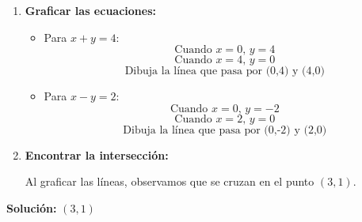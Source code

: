     \begin{enumerate}
        \item \textbf{Graficar las ecuaciones:}
            \begin{itemize}
                \item Para \(x + y = 4\):
                    \[
                    \text{Cuando } x = 0, \, y = 4
                    \]
                    \[
                    \text{Cuando } x = 4, \, y = 0
                    \]
                    \[
                    \text{Dibuja la línea que pasa por (0,4) y (4,0)}
                    \]
    
                \item Para \(x - y = 2\):
                    \[
                    \text{Cuando } x = 0, \, y = -2
                    \]
                    \[
                    \text{Cuando } x = 2, \, y = 0
                    \]
                    \[
                    \text{Dibuja la línea que pasa por (0,-2) y (2,0)}
                    \]
            \end{itemize}
    
        \item \textbf{Encontrar la intersección:}
    
            Al graficar las líneas, observamos que se cruzan en el punto \((3, 1)\).
    \end{enumerate}
    
    \textbf{Solución:} \( (3, 1) \)
    
